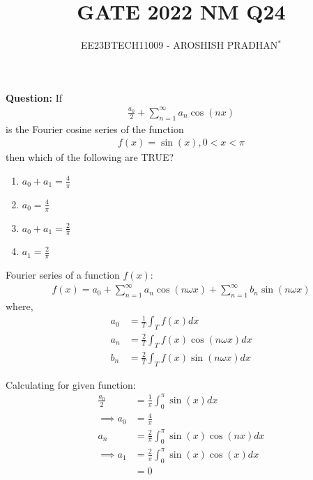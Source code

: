 \documentclass[journal,12pt,twocolumn]{IEEEtran}
\theoremstyle{remark}
\begin{document}

\vspace{3cm}

\title{GATE 2022 NM Q24}
\author{EE23BTECH11009 - AROSHISH PRADHAN$^{*}$%
}
\maketitle
\newpage
\bigskip
\textbf{Question:} If 
\begin{align}
    \frac{a_0}{2} + \sum_{n=1}^{\infty}a_n\cos(nx)\nonumber
\end{align}
is the Fourier cosine series of the function
\begin{align}
    f(x) = \sin(x), 0 < x < \pi \nonumber
\end{align}
then which of the following are TRUE?
\begin{enumerate}[label=(\alph*)]
    \item $a_0 + a_1 = \frac{4}{\pi}$
    \item $a_0 = \frac{4}{\pi}$
    \item $a_0 + a_1 = \frac{2}{\pi}$
    \item $a_1 = \frac{2}{\pi}$
\end{enumerate}
\solution
\fi


Fourier series of a function $f(x)$:
\begin{align}
    f(x) = a_0 + \sum_{n=1}^{\infty}a_n\cos(n\omega x) + \sum_{n=1}^{\infty}b_n\sin(n\omega x) 
\end{align}
where,
\begin{align}
    a_0 &= \frac{1}{T}\int_{T}f(x)dx\\
    a_n &= \frac{2}{T}\int_{T}f(x)\cos(n\omega x)dx\\
    b_n &= \frac{2}{T}\int_{T}f(x)\sin(n\omega x)dx
\end{align}

Calculating for given function:
\begin{align}
    \frac{a_0}{2} &= \frac{1}{\pi}\int_{0}^{\pi}\sin(x)dx\\
    \implies a_0 &= \frac{4}{\pi} \label{eq:6_gate.22.nm.24}\\
    a_n &= \frac{2}{\pi}\int_{0}^{\pi}\sin(x)\cos(nx)dx\\
    \implies a_1 &= \frac{2}{\pi}\int_{0}^{\pi}\sin(x)\cos(x)dx\\
    &= 0 \label{eq:9_gate.22.nm.24}
\end{align}
\end{document}
